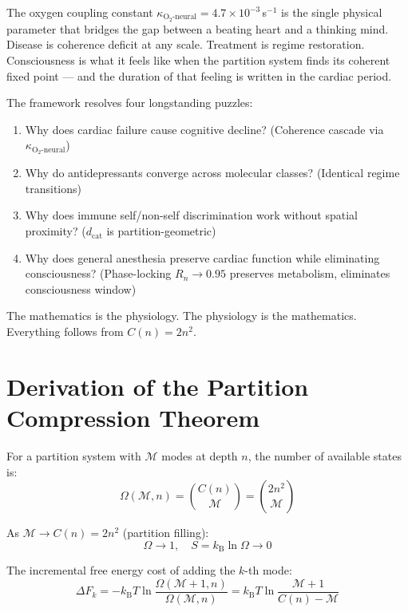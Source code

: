 \documentclass[10pt,twocolumn,a4paper]{article}
\theoremstyle{definition}
\newcommand{\kB}{k_{\text{B}}}
\newcommand{\kBT}{k_{\text{B}}T}
\newcommand{\dcat}{d_{\text{cat}}}
\begin{document}
The oxygen coupling constant $\kappa_{\text{O}_2\text{-neural}} = 4.7 \times 10^{-3}$\,s$^{-1}$
is the single physical parameter that bridges the gap between a beating heart
and a thinking mind. Disease is coherence deficit at any scale. Treatment is
regime restoration. Consciousness is what it feels like when the partition
system finds its coherent fixed point — and the duration of that feeling is
written in the cardiac period.

The framework resolves four longstanding puzzles:
\begin{enumerate}
\item Why does cardiac failure cause cognitive decline? (Coherence cascade via $\kappa_{\text{O}_2\text{-neural}}$)
\item Why do antidepressants converge across molecular classes? (Identical regime transitions)
\item Why does immune self/non-self discrimination work without spatial proximity? ($\dcat$ is partition-geometric)
\item Why does general anesthesia preserve cardiac function while eliminating consciousness? (Phase-locking $R_n \to 0.95$ preserves metabolism, eliminates consciousness window)
\end{enumerate}

The mathematics is the physiology. The physiology is the mathematics.
Everything follows from $C(n) = 2n^2$.

\appendix

\section{Derivation of the Partition Compression Theorem}
\label{app:compression}

For a partition system with $\mathcal{M}$ modes at depth $n$, the number of
available states is:
\begin{equation}
\Omega(\mathcal{M}, n) = \binom{C(n)}{\mathcal{M}} = \binom{2n^2}{\mathcal{M}}
\end{equation}

As $\mathcal{M} \to C(n) = 2n^2$ (partition filling):
\begin{equation}
\Omega \to 1, \quad S = \kB \ln \Omega \to 0
\end{equation}

The incremental free energy cost of adding the $k$-th mode:
\begin{equation}
\Delta F_k = -\kBT \ln\frac{\Omega(\mathcal{M}+1,n)}{\Omega(\mathcal{M},n)}
= \kBT \ln\frac{\mathcal{M}+1}{C(n) - \mathcal{M}}
\end{equation}
\end{document}
